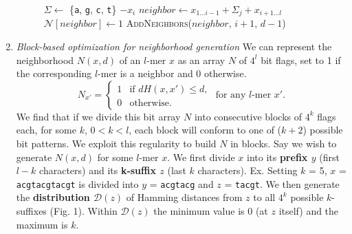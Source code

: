 \documentclass[conference]{IEEEtran}
\begin{document}
\begin{enumerate}[label={\em \arabic*.}]
\begin{figure}[b]
\begin{algorithmic}[1]
						\State $\Sigma \leftarrow$ \{\texttt{a}, \texttt{g}, \texttt{c}, \texttt{t}\} $- x_{i}$ \hspace*{6pt}
							\State $neighbor \leftarrow x_{1...i-1} + \Sigma_{j} + x_{i+1...l}$
							\State $\mathcal{N}[neighbor] \leftarrow 1$
								\State \textsc{AddNeighbors}($neighbor$, $i+1$, $d-1$)
							\EndIf
						\EndFor
					\EndFor
				\EndProcedure
				\end{algorithmic}
			\end{figure}
		\newpage
		\item{\em Block-based optimization for neighborhood generation}\newline
			We can represent the neighborhood $N(x,d)$ of an $l$-mer $x$ as an array $N$ of $4^{l}$ bit flags, set to 1 if the corresponding $l$-mer is a neighbor and 0 otherwise.
			\begin{equation*}
				N_{x'} = \left\{
				\begin{array}{rl}
					1 & \text{if } dH(x,x') \leq d,\\
					0 & \text{otherwise.}%
				\end{array} \right.
				\text{ for any $l$-mer }x'.
				\end{equation*}
			We find that if we divide this bit array $N$ into consecutive blocks of $4^{k}$ flags each, for some $k$, $0 < k < l$, each block will conform to one of ($k + 2$) possible bit patterns. We exploit this regularity to build $N$ in blocks.\newline\newline
			Say we wish to generate $N(x,d)$ for some $l$-mer $x$. We first divide $x$ into its {\boldmath\bf prefix $y$} (first $l-k$ characters) and its {\boldmath\bf k-suffix $z$} (last $k$ characters).\newline\newline	
				{\small 
					Ex. Setting $k$ = 5, $x$ = \texttt{acgtacgtacgt}\newline
					\hspace*{18pt}is divided into $y$ = \texttt{acgtacg} and $z$ = \texttt{tacgt}.}\newline\newline
			We then generate the {\boldmath\bf distribution $\mathcal{D}(z)$} of Hamming distances from $z$ to all $4^{k}$ possible $k$-suffixes (Fig. 1). Within $\mathcal{D}(z)$ the minimum value is 0 (at $z$ itself) and the maximum is $k$.%
			\begin{figure}[h]

\end{figure}
\end{enumerate}
\end{document}
